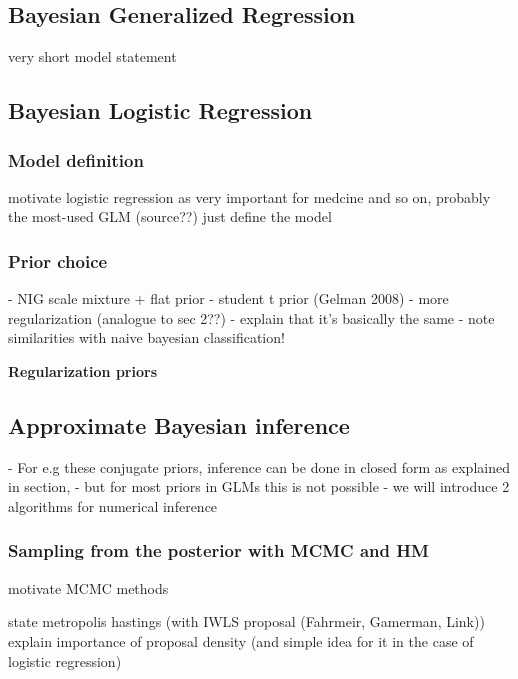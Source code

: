 \subsection{Bayesian Generalized Regression}\label{sec:logit-glm}

very short model statement

\subsection{Bayesian Logistic Regression} \label{sec:logit-logit}

\subsubsection*{Model definition}

motivate logistic regression as very important for medcine and so on, probably the most-used GLM (source??)
just define the model


\subsubsection*{Prior choice}

- NIG scale mixture + flat prior
- student t prior (Gelman 2008)
- more regularization (analogue to sec 2??)
    - explain that it's basically the same
- note similarities with naive bayesian classification!

\textbf{Regularization priors}


\subsection{Approximate Bayesian inference} \label{sec:logit-inf}

- For e.g these conjugate priors, inference can be done in closed form as explained in section, 
- but for most priors in GLMs this is not possible
- we will introduce 2 algorithms for numerical inference

\subsubsection*{Sampling from the posterior with MCMC and HM}

motivate MCMC methods

state metropolis hastings (with IWLS proposal (Fahrmeir, Gamerman, Link))
explain importance of proposal density (and simple idea for it in the case of logistic regression)

